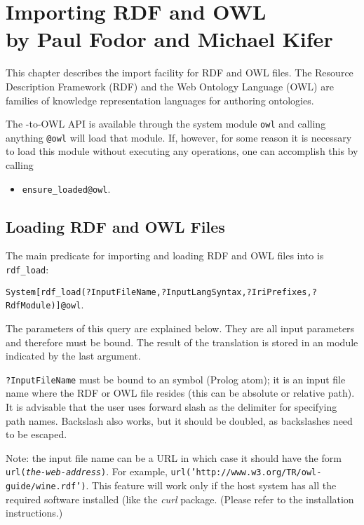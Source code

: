 \chapter[Loading RDF and OWL files]
{Importing RDF and OWL\\
  {\Large by Paul Fodor and Michael Kifer}}

This chapter describes the \ERGO import facility for RDF and OWL files.
The Resource Description Framework (RDF) and the Web Ontology
Language (OWL) are families of knowledge representation languages for
authoring ontologies.

The \ERGO-to-OWL API is available through the \ERGO system module
\texttt{\bs{}owl}
and calling anything \texttt{@\bs{}owl}  will load that module. If, however, for
some reason it is necessary to load this module without executing any
operations, one can accomplish this by calling 
\begin{itemize}
\item  \texttt{ensure\_loaded@\bs{}owl}. 
\end{itemize}

\section{Loading RDF and OWL Files}

The main predicate for importing and loading RDF and OWL files into \ERGO is
\texttt{rdf\_load}:

  \texttt{System[rdf\_load(?InputFileName,?InputLangSyntax,?IriPrefixes,?RdfModule)]@\bs{}owl}.

  The parameters of this query are explained below. They are all input
  parameters and therefore must be bound. The result of the translation is
  stored in an \ERGO module indicated by the last argument.
  
  \texttt{?InputFileName}  must be bound to an \ERGO symbol (Prolog atom);
  it is an input file name where the RDF or OWL file resides 
  (this can be absolute or relative path).
  It is advisable that the user uses forward slash as the delimiter for
  specifying path names.
  Backslash also works, but it should be doubled, as backslashes
  need to be escaped.

  Note: the input file name can be a URL in which case it should have the
  form \texttt{url(\textnormal{\emph{the-web-address}})}. For example,
  \texttt{url('http://www.w3.org/TR/owl-guide/wine.rdf')}. 
  This feature will work only if the host system has all the required
  software installed (like the \emph{curl} package. (Please refer to the
  installation instructions.) 
  


